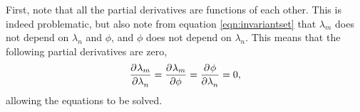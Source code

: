 First, note that all the partial derivatives are functions of each other. This is indeed problematic, but also note from equation \ref{eqn:invariantset} that $\lambda_m$ does not depend on $\lambda_n$ and $\phi$, and $\phi$ does not depend on $\lambda_n$. This means that the following partial derivatives are zero,
\begin{equation}\label{eqn:henckystraindependence}
\begin{aligned}
\dpd{\lambda_m}{\lambda_n} = \dpd{\lambda_m}{\phi} = \dpd{\phi}{\lambda_n} = 0,
\end{aligned}
\end{equation}
allowing the equations to be solved. 

